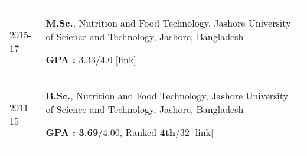 


\begin{longtable}[l]{@{}p{} p{}}
   
2015-17 & \textbf{M.Sc.}, Nutrition and Food Technology, Jashore University of Science and Technology, Jashore, Bangladesh\par
\textbf{GPA :} 3.33/4.0 \href{https://1drv.ms/b/c/919fe16e04062443/EUMkBgRu4Z8ggJGKYAAAAAABuziKV7ZHZAA2LLVViffwrw?e=uFCn5c}{[link]} \\

2011-15 & \textbf{B.Sc.}, Nutrition and Food Technology, Jashore University of Science and Technology, Jashore, Bangladesh\par       \textbf{GPA :} \textbf{3.69}/4.00, Ranked \textbf{4th}/32 \href{https://1drv.ms/b/c/919fe16e04062443/EUMkBgRu4Z8ggJGLYAAAAAABi_cx8swChUY52w3HJ3UUKA?e=poyN2l}{[link]}
\end{longtable}
